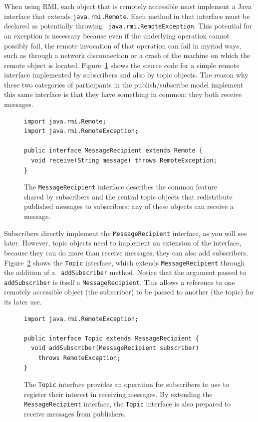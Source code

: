 When using RMI, each object that is remotely accessible must implement
a Java interface that extends {\tt java.rmi.Remote}.  Each method in
that interface must be declared as potentially throwing {\tt
java.rmi.RemoteException}.  This potential for an exception is
necessary because even if the underlying operation cannot possibly
fail, the remote invocation of that operation can fail in myriad ways,
such as through a network disconnection or a crash of the machine on which
the remote object is located.  Figure~\ref{MessageRecipient-source}
shows the source code for a simple remote interface implemented by
subscribers and also by topic objects.  The reason why these two
categories of participants in the publish/subscribe model
implement this same interface is that they have something in common:
they both receive messages.
\begin{figure}
\begin{verbatim}
import java.rmi.Remote;
import java.rmi.RemoteException;

public interface MessageRecipient extends Remote {
  void receive(String message) throws RemoteException;
}
\end{verbatim}
\caption{The {\tt MessageRecipient} interface describes the common
  feature shared by subscribers and the central topic objects that
  redistribute published messages to subscribers: any of these objects
  can receive a message.}\label{MessageRecipient-source}
\end{figure}

Subscribers directly implement the {\tt MessageRecipient}
interface, as you will see later.  However, topic objects need to
implement an extension of the interface, because they can do
more than receive messages; they can also add subscribers.
Figure~\ref{Topic-source} shows the {\tt Topic} interface, which
extends {\tt MessageRecipient} through the addition of a {\tt
  addSubscriber} method.  Notice that the argument passed to {\tt
  addSubscriber} is itself a {\tt MessageRecipient}.  This allows a
reference to one remotely accessible object (the subscriber) to be
passed to another (the topic) for its later use.
\begin{figure}
\begin{verbatim}
import java.rmi.RemoteException;

public interface Topic extends MessageRecipient {
  void addSubscriber(MessageRecipient subscriber)
    throws RemoteException;
}
\end{verbatim}
\caption{The {\tt Topic} interface provides an operation for
  subscribers to use to register their interest in receiving messages.
  By extending the {\tt MessageRecipient} interface, the {\tt Topic}
  interface is also prepared to receive messages from publishers.}\label{Topic-source}
\end{figure}

